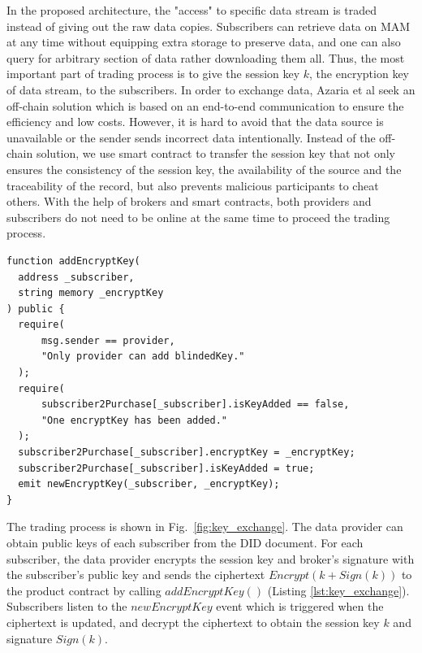\documentclass[conference]{IEEEtran}
\begin{document}
In the proposed architecture, the "access" to specific data stream is traded instead of giving out the raw data copies. Subscribers can retrieve data on MAM at any time without equipping extra storage to preserve data, and one can also query for arbitrary section of data rather downloading them all. Thus, the most important part of trading process is to give the session key $k$, the encryption key of data stream, to the subscribers. In order to exchange data, Azaria et al\cite{Medrec} seek an off-chain solution which is based on an end-to-end communication to ensure the efficiency and low costs. However, it is hard to avoid that the data source is unavailable or the sender sends incorrect data intentionally. Instead of the off-chain solution, we use smart contract to transfer the session key\cite{3tierDataMarket} that not only ensures the consistency of the session key, the availability of the source and the traceability of the record, but also prevents malicious participants to cheat others. With the help of brokers and smart contracts, both providers and subscribers do not need to be online at the same time to proceed the trading process.

\lstset{style=solidity}

\begin{lstlisting}[caption={Update encryption key}, label={lst:key_exchange}, frame=single]
function addEncryptKey(
  address _subscriber,
  string memory _encryptKey
) public {
  require(
      msg.sender == provider,
      "Only provider can add blindedKey."
  );
  require(
      subscriber2Purchase[_subscriber].isKeyAdded == false,
      "One encryptKey has been added."
  );
  subscriber2Purchase[_subscriber].encryptKey = _encryptKey;
  subscriber2Purchase[_subscriber].isKeyAdded = true;
  emit newEncryptKey(_subscriber, _encryptKey);
}
\end{lstlisting}

The trading process is shown in Fig.~\ref{fig:key_exchange}. The data provider can obtain public keys of each subscriber from the DID document. For each subscriber, the data provider encrypts the session key and broker's signature with the subscriber's public key and sends the ciphertext $Encrypt(k + Sign(k))$ to the product contract by calling $addEncryptKey()$ (Listing \ref{lst:key_exchange}). Subscribers listen to the $newEncryptKey$ event which is triggered when the ciphertext is updated, and decrypt the ciphertext to obtain the session key $k$ and signature $Sign(k)$.
\end{document}
